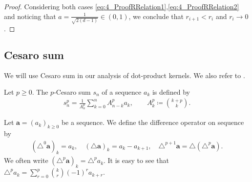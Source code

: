 \begin{proof}
  Considering both cases \cref{eq:4_ProofRRelation1},\cref{eq:4_ProofRRelation2} and noticing that
  $a = \frac{1}{\sqrt {2(d-1)}} \in (0,1)$,
  we conclude that $r_{i+1} < r_i$ and $r_i \to 0$.
\end{proof}

\subsection{Cesaro sum}\label{subsec:AUX_Cesaro}
We will use Cesaro sum in our analysis of dot-product kernels.
We also refer to \citet[Section A.4]{dai2013_ApproximationTheory}.
\begin{definition}
  Let $p \geq 0$.
  The $p$-Cesaro sum $s_n$ of a sequence $a_k$ is defined by
  \begin{align}
    s_n^p = \frac{1}{A_n^p}\sum_{k=0}^n A_{n-k}^{p} a_{k}, \qquad A_k^{p} \coloneqq \binom{k+p}{k}.
  \end{align}
\end{definition}
%
%

\begin{definition}[Difference]
  \label{def:DifferenceOperator}
  Let $\bm{a} = (a_k)_{k\geq 0}$ be a sequence.
  We define the difference operator on sequence by
  \begin{align}
  (\triangle^0 \bm{a})
    _k = a_k, \quad
    (\triangle \bm{a})_k = a_{k} - a_{k+1}, \quad
    \triangle^{p+1} \bm{a} = \triangle(\triangle^{p}\bm{a}).
  \end{align}
  We often write $(\triangle^{p} \bm{a})_k = \triangle^{p} a_{k}$.
  It is easy to see that $\triangle^{p} a_{k} = \sum_{r=0}^p \binom{k}{r} (-1)^r a_{k+r}.$

\end{definition}


